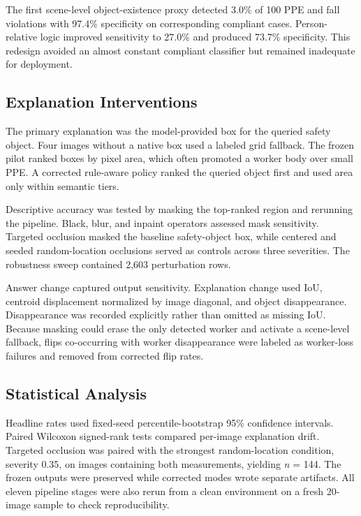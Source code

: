 \documentclass[12pt,letterpaper,twoside]{article}
\begin{document}
The first scene-level object-existence proxy detected 3.0\% of 100 PPE and fall violations with 97.4\% specificity on corresponding compliant cases. Person-relative logic improved sensitivity to 27.0\% and produced 73.7\% specificity. This redesign avoided an almost constant compliant classifier but remained inadequate for deployment.

\subsection{Explanation Interventions}

The primary explanation was the model-provided box for the queried safety object. Four images without a native box used a labeled grid fallback. The frozen pilot ranked boxes by pixel area, which often promoted a worker body over small PPE. A corrected rule-aware policy ranked the queried object first and used area only within semantic tiers.

Descriptive accuracy was tested by masking the top-ranked region and rerunning the pipeline. Black, blur, and inpaint operators assessed mask sensitivity. Targeted occlusion masked the baseline safety-object box, while centered and seeded random-location occlusions served as controls across three severities. The robustness sweep contained 2,603 perturbation rows.

Answer change captured output sensitivity. Explanation change used IoU, centroid displacement normalized by image diagonal, and object disappearance. Disappearance was recorded explicitly rather than omitted as missing IoU. Because masking could erase the only detected worker and activate a scene-level fallback, flips co-occurring with worker disappearance were labeled as worker-loss failures and removed from corrected flip rates.

\subsection{Statistical Analysis}

Headline rates used fixed-seed percentile-bootstrap 95\% confidence intervals. Paired Wilcoxon signed-rank tests compared per-image explanation drift. Targeted occlusion was paired with the strongest random-location condition, severity 0.35, on images containing both measurements, yielding \textit{n} = 144. The frozen outputs were preserved while corrected modes wrote separate artifacts. All eleven pipeline stages were also rerun from a clean environment on a fresh 20-image sample to check reproducibility.
\end{document}

